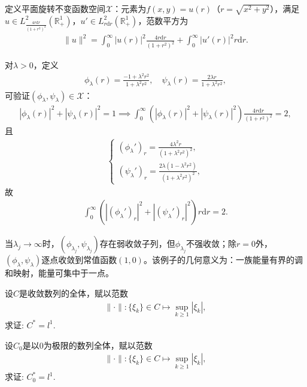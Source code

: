 \documentclass[../../main.tex]{subfiles}%
\begin{document}
\begin{example}[集中型弱收敛]

定义平面旋转不变函数空间$\mathscr{X}$：元素为$f(x,y)=u(r)$（$r=\sqrt{x^2+y^2}$），满足$u\in L^2_{\frac{4r\mathrm{d}r}{(1+r^2)^2}}(\mathbb{R}_+^1)$，$u'\in L^2_{r\mathrm{d}r}(\mathbb{R}_+^1)$，范数平方为
\begin{align*}
\|u\|^2=\int_{0}^{\infty}|u(r)|^2\frac{4r\mathrm{d}r}{(1+r^2)^2}+\int_{0}^{\infty}|u'(r)|^2r\mathrm{d}r.
\end{align*}

对$\lambda>0$，定义
\begin{align*}
\phi_\lambda(r)=\frac{-1+\lambda^2r^2}{1+\lambda^2r^2},\quad \psi_\lambda(r)=\frac{2\lambda r}{1+\lambda^2r^2},
\end{align*}
可验证$(\phi_\lambda,\psi_\lambda)\in\mathscr{X}$：
\begin{align*}
|\phi_\lambda(r)|^2+|\psi_\lambda(r)|^2=1\implies\int_{0}^{\infty}\left(|\phi_\lambda(r)|^2+|\psi_\lambda(r)|^2\right)\frac{4r\mathrm{d}r}{(1+r^2)^2}=2,
\end{align*}
且
\begin{align*}
\begin{cases}
(\phi_\lambda')_r=\frac{4\lambda^2r}{(1+\lambda^2r^2)^2},\\
(\psi_\lambda')_r=\frac{2\lambda(1-\lambda^2r^2)}{(1+\lambda^2r^2)^2},
\end{cases}
\end{align*}
故
\begin{align*}
\int_{0}^{\infty}\left(|(\phi_\lambda')_r|^2+|(\psi_\lambda')_r|^2\right)r\mathrm{d}r=2.
\end{align*}

当$\lambda_j\to\infty$时，$(\phi_{\lambda_j},\psi_{\lambda_j})$存在弱收敛子列，但$\phi_{\lambda_j}$不强收敛；除$r=0$外，$(\phi_\lambda,\psi_\lambda)$逐点收敛到常值函数$(1,0)$。该例子的几何意义为：一族能量有界的调和映射，能量可集中于一点。
\end{example}

\begin{example}
设$C$是收敛数列的全体，赋以范数
\begin{align*}
\|\cdot\|:\{\xi_k\}\in C\mapsto \sup\limits_{k\geqslant1}|\xi_k|,
\end{align*}
求证: $C^*=l^1$.
\end{example}

\begin{example}
设$C_0$是以$0$为极限的数列全体，赋以范数
\begin{align*}
\|\cdot\|:\{\xi_k\}\in C\mapsto \sup\limits_{k\geqslant1}|\xi_k|,
\end{align*}
求证: $C_0^*=l^1$.
\end{example}
\end{document}
